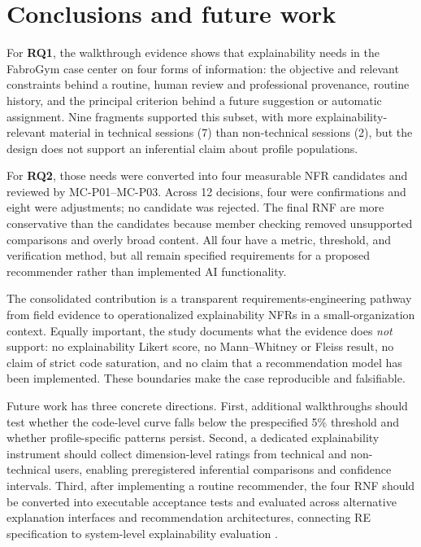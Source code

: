 \documentclass[pdflatex,sn-basic]{sn-jnl}
\begin{document}
\section{Conclusions and future work}\label{sec:conclusion}
For \textbf{RQ1}, the walkthrough evidence shows that explainability needs in the FabroGym case center on four forms of information: the objective and relevant constraints behind a routine, human review and professional provenance, routine history, and the principal criterion behind a future suggestion or automatic assignment. Nine fragments supported this subset, with more explainability-relevant material in technical sessions (7) than non-technical sessions (2), but the design does not support an inferential claim about profile populations.

For \textbf{RQ2}, those needs were converted into four measurable NFR candidates and reviewed by MC-P01--MC-P03. Across 12 decisions, four were confirmations and eight were adjustments; no candidate was rejected. The final RNF are more conservative than the candidates because member checking removed unsupported comparisons and overly broad content. All four have a metric, threshold, and verification method, but all remain specified requirements for a proposed recommender rather than implemented AI functionality.

The consolidated contribution is a transparent requirements-engineering pathway from field evidence to operationalized explainability NFRs in a small-organization context. Equally important, the study documents what the evidence does \emph{not} support: no explainability Likert score, no Mann--Whitney or Fleiss result, no claim of strict code saturation, and no claim that a recommendation model has been implemented. These boundaries make the case reproducible and falsifiable.

Future work has three concrete directions. First, additional walkthroughs should test whether the code-level curve falls below the prespecified 5\% threshold and whether profile-specific patterns persist. Second, a dedicated explainability instrument should collect dimension-level ratings from technical and non-technical users, enabling preregistered inferential comparisons and confidence intervals. Third, after implementing a routine recommender, the four RNF should be converted into executable acceptance tests and evaluated across alternative explanation interfaces and recommendation architectures, connecting RE specification to system-level explainability evaluation \cite{chazette2022,gedikli2014,zhangchen2020}.
\end{document}
